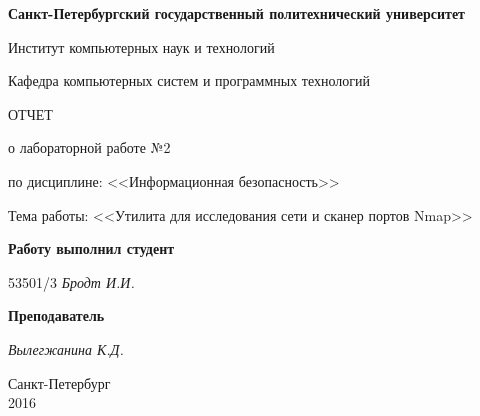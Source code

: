 \begin{titlepage}
\begin{center}

\textbf{Санкт-Петербургский государственный политехнический университет}

\vspace{5mm}
Институт компьютерных наук и технологий

\vspace{5mm}
Кафедра компьютерных систем и программных технологий

\vspace*{\fill}

\huge{ОТЧЕТ}

\Large{о лабораторной работе №2}
\vspace{2mm}

\large{по дисциплине: <<Информационная безопасность>>}

\vspace*{2mm}
\large{Тема работы: <<Утилита для исследования сети и сканер портов Nmap>>}

\vspace*{\fill}
\end{center}

\begin{large}
\hspace{0.35\linewidth} \textbf{Работу выполнил студент}

\vspace{5mm}
\hspace{0.35\linewidth} 53501/3 \hspace{1cm} \textit{Бродт И.И.}

\vspace{3mm}
\hspace{0.35\linewidth} \textbf{Преподаватель}

\vspace{5mm}
\hspace{0.35\linewidth} \underline{\hspace{2cm} } \hspace{3mm} \textit{Вылегжанина К.Д.}
\end{large}

\vspace*{3cm}

\begin{center}
\normalsize Санкт-Петербург\\2016
\end{center}
\end{titlepage}